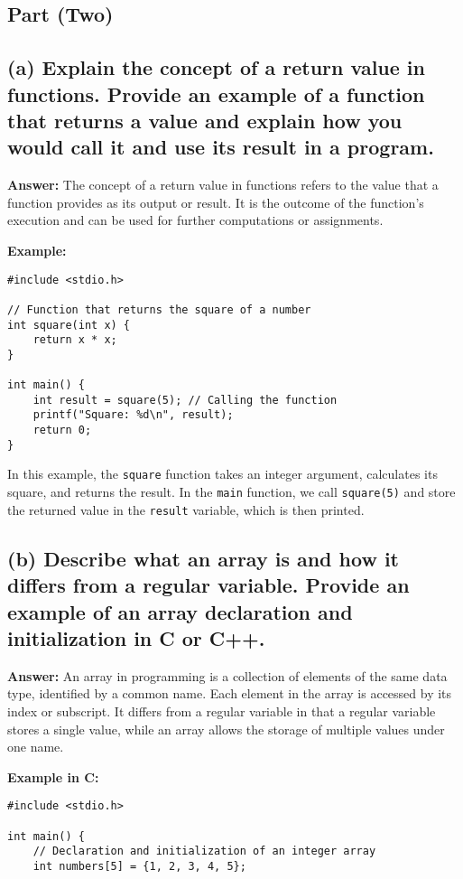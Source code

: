 \documentclass{article}
\begin{document}
\begin{enumerate}
\section*{Part (Two)}

\subsection*{(a) Explain the concept of a return value in functions. Provide an example of a function that returns a value and explain how you would call it and use its result in a program.}

\textbf{Answer:} The concept of a return value in functions refers to the value that a function provides as its output or result. It is the outcome of the function's execution and can be used for further computations or assignments.

\textbf{Example:}
\begin{verbatim}
#include <stdio.h>

// Function that returns the square of a number
int square(int x) {
    return x * x;
}

int main() {
    int result = square(5); // Calling the function
    printf("Square: %d\n", result);
    return 0;
}
\end{verbatim}

In this example, the \texttt{square} function takes an integer argument, calculates its square, and returns the result. In the \texttt{main} function, we call \texttt{square(5)} and store the returned value in the \texttt{result} variable, which is then printed.

\subsection*{(b) Describe what an array is and how it differs from a regular variable. Provide an example of an array declaration and initialization in C or C++.}

\textbf{Answer:} An array in programming is a collection of elements of the same data type, identified by a common name. Each element in the array is accessed by its index or subscript. It differs from a regular variable in that a regular variable stores a single value, while an array allows the storage of multiple values under one name.

\textbf{Example in C:}
\begin{verbatim}
#include <stdio.h>

int main() {
    // Declaration and initialization of an integer array
    int numbers[5] = {1, 2, 3, 4, 5};


\end{verbatim}
\end{enumerate}
\end{document}
